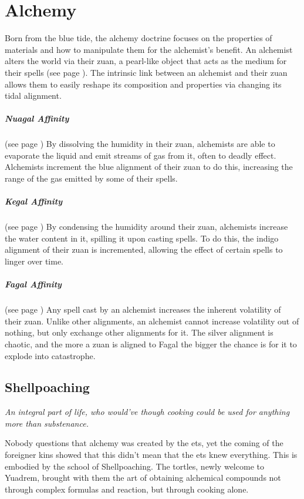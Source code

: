 \section{Alchemy} \label{sec::alchemy}
Born from the blue tide, the alchemy doctrine focuses on the properties of materials and how to manipulate them for the alchemist's benefit.
An alchemist alters the world via their zuan, a pearl-like object that acts as the medium for their spells (see page \pageref{item::zuan}).
The intrinsic link between an alchemist and their zuan allows them to easily reshape its composition and properties via changing its tidal alignment.

\subparagraph{Nuagal Affinity}
    (see page \pageref{medium::dissolve})
    By dissolving the humidity in their zuan, alchemists are able to evaporate the liquid and emit streams of gas from it, often to deadly effect.
    Alchemists increment the blue alignment of their zuan to do this, increasing the range of the gas emitted by some of their spells.

\subparagraph{Kegal Affinity}
    (see page \pageref{medium::condense})
    By condensing the humidity around their zuan, alchemists increase the water content in it, spilling it upon casting spells.
    To do this, the indigo alignment of their zuan is incremented, allowing the effect of certain spells to linger over time.

\subparagraph{Fagal Affinity}
    (see page \pageref{medium::volatilize})
    Any spell cast by an alchemist increases the inherent volatility of their zuan.
    Unlike other alignments, an alchemist cannot increase volatility out of nothing, but only exchange other alignments for it.
    The silver alignment is chaotic, and the more a zuan is aligned to Fagal the bigger the chance is for it to explode into catastrophe.

\subsection*{Shellpoaching} \label{ssec::shellpoaching}
    \textit{An integral part of life, who would've though cooking could be used for anything more than substenance.}

    Nobody questions that alchemy was created by the ets, yet the coming of the foreigner kins showed that this didn't mean that the ets knew everything.
    This is embodied by the school of Shellpoaching.
    The tortles, newly welcome to Yuadrem, brought with them the art of obtaining alchemical compounds not through complex formulas and reaction, but through cooking alone.

